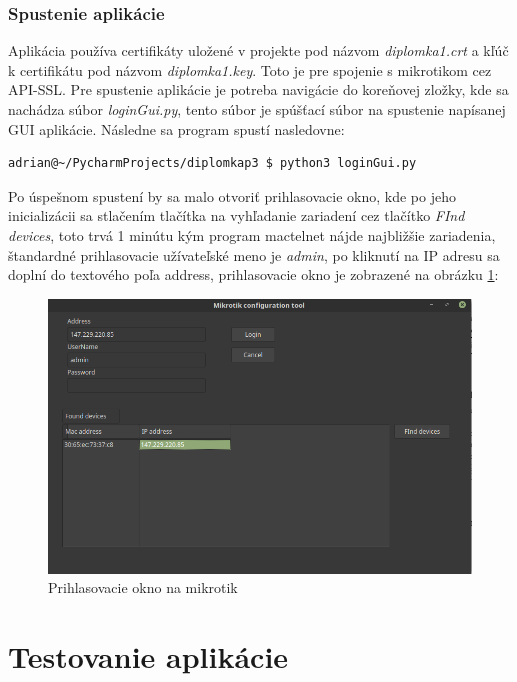 \subsection{Spustenie aplikácie}
Aplikácia používa certifikáty uložené v projekte pod názvom \textit{diplomka1.crt} a kľúč k certifikátu pod názvom \textit{diplomka1.key}. Toto je pre spojenie s mikrotikom cez API-SSL. Pre spustenie aplikácie je potreba navigácie do koreňovej zložky, kde sa nachádza súbor \textit{loginGui.py}, tento súbor je spúšťací súbor na spustenie napísanej GUI aplikácie. Následne sa program spustí nasledovne:
\begin{lstlisting}[language=bash, frame=single, caption=Spustenie aplikácie,captionpos=b, showstringspaces=false]
adrian@~/PycharmProjects/diplomkap3 $ python3 loginGui.py
\end{lstlisting}
Po úspešnom spustení by sa malo otvoriť prihlasovacie okno, kde po jeho inicializácii sa stlačením tlačítka na vyhľadanie zariadení cez tlačítko \textit{FInd devices}, toto trvá 1 minútu kým program mactelnet nájde najbližšie zariadenia, štandardné prihlasovacie užívateľské meno je \textit{admin}, po kliknutí na IP adresu sa doplní do textového poľa address, prihlasovacie okno je zobrazené na obrázku \ref{fig:winboxcustom}:
\begin{figure}[H]
\centering
\includegraphics[scale=0.48]{../text/winboxcustom.png}
\caption{Prihlasovacie okno na mikrotik}
\label{fig:winboxcustom}
\end{figure}
\chapter{Testovanie aplikácie}


